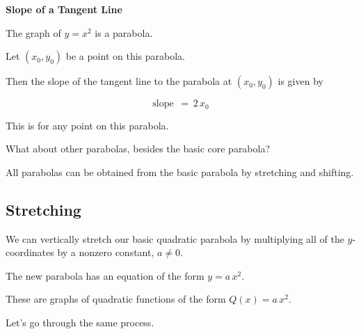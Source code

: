 \documentclass{ximera}
\begin{document}
\begin{conclusion} \textbf{\textcolor{green!25!black}{Slope of a Tangent Line}} 


The graph of $y = x^2$ is a parabola.

Let $(x_0, y_0)$ be a point on this parabola.

Then the slope of the tangent line to the parabola at $(x_0, y_0)$ is given by 



\[ \text{slope } \, = \, 2 \, x_0  \]


\end{conclusion}
This is for any point on this parabola. 

What about other parabolas, besides the basic core parabola? 

All parabolas can be obtained from the basic parabola by stretching and shifting. 



























\subsection*{Stretching}



We can vertically stretch our basic quadratic parabola by multiplying all of the $y$-coordinates by a nonzero constant, $a \ne 0$. 


The new parabola has an equation of the form $y = a \, x^2$. 

These are graphs of quadratic functions of the form $Q(x) = a \, x^2$. 


Let's go through the same process. 
\end{document}
